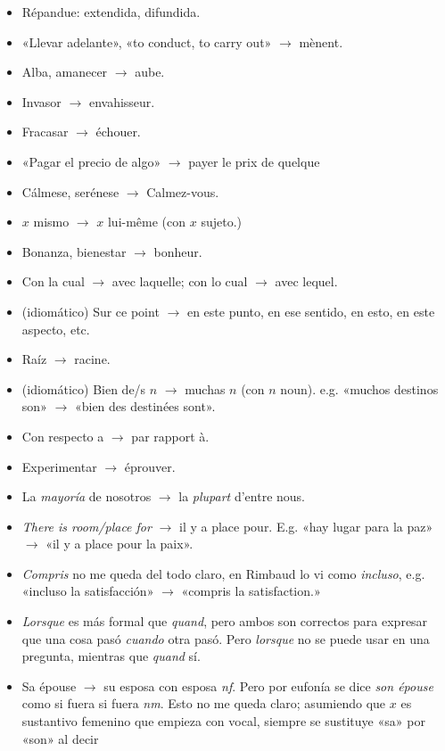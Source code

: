 \documentclass[a4paper, 12pt]{article}
\begin{document}
\begin{itemize}
    \item Répandue: extendida, difundida.
    \item «Llevar adelante», «to conduct, to carry out» $\to $ mènent.
    \item Alba, amanecer $\to $ aube. 
    \item Invasor $\to $ envahisseur.
    \item Fracasar $\to $ échouer.
    \item «Pagar el precio de algo» $\to $ payer le prix de quelque 
    \item Cálmese, serénese $\to $ Calmez-vous.
    \item $x$ mismo $\to $ $x$ lui-même (con $x$ sujeto.)
    \item Bonanza, bienestar $\to $ bonheur.
    \item Con la cual $\to $ avec laquelle; con lo cual $\to $ avec lequel.
    \item (idiomático) Sur ce point $\to $ en este punto, en ese sentido, en
        esto, en este aspecto, etc.
    \item Raíz $\to $ racine. 
    \item (idiomático) Bien de/s $n$ $\to $ muchas $n$ (con $n$ noun). e.g.
    «muchos destinos son» $\to $ «bien des destinées sont».
\item Con respecto a $\to $ par rapport à.
\item Experimentar $\to $ éprouver.
\item La \textit{mayoría} de nosotros $\to $ la \textit{plupart} d'entre nous.
\item \textit{There is room/place for} $\to $ il y a place pour. E.g. «hay lugar
    para la paz» $\to $ «il y a place pour la paix».
\item \textit{Compris} no me queda del todo claro, en Rimbaud lo vi como 
\textit{incluso}, e.g. «incluso la satisfacción» $\to $ «compris la
satisfaction.» 
\item \textit{Lorsque} es más formal que \textit{quand}, pero ambos son
    correctos para expresar que una cosa pasó \textit{cuando} otra pasó. 
    Pero \textit{lorsque} no se puede usar en una pregunta, mientras que 
    \textit{quand} sí. 
\item Sa épouse $\to $ su esposa con esposa \textit{nf}. Pero por eufonía se
    dice \textit{son épouse} como si fuera si fuera \textit{nm}. 
    Esto no me queda claro; asumiendo que $x$ es sustantivo femenino que
    empieza con vocal, siempre se sustituye «sa» por «son» al decir 

\end{itemize}
\end{document}
